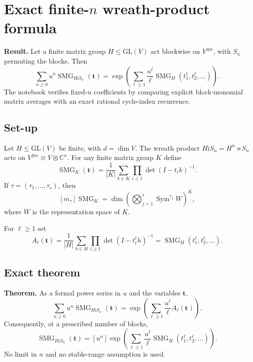 \documentclass[10pt]{article}
\newcommand{\Sym}{\operatorname{Sym}}
\newcommand{\SMG}{\operatorname{SMG}}
\newcommand{\C}{\mathbb C}
\begin{document}
\section[Exact finite-n wreath-product formula]{Exact finite-$n$ wreath-product formula}\label{proof:wreath-finite}
\begingroup
{}
\providecommand{\Ms}{\SMG}
\renewcommand{\Ms}{\SMG}
\providecommand{\Sym}{\operatorname{Sym}}
\renewcommand{\Sym}{\operatorname{Sym}}
\providecommand{\coeff}[1]{\left[#1\right]}
\renewcommand{\coeff}[1]{\left[#1\right]}
\providecommand{\C}{\mathbb C}
\renewcommand{\C}{\mathbb C}
\setcounter{theorem}{0}
\setcounter{proposition}{0}
\setcounter{lemma}{0}
\setcounter{corollary}{0}
\setcounter{remark}{0}
\colorbox{Pale}{\parbox{0.94\linewidth}{
\textbf{Result.} Let a finite matrix group $H\leq\mathrm{GL}(V)$ act blockwise
on $V^{\oplus n}$, with $S_n$ permuting the blocks.  Then
\[
\boxed{\displaystyle
\sum_{n\geq0}u^n\Ms_{H\wr S_n}(\mathbf t)
=\exp\!\left(\sum_{\ell\geq1}\frac{u^\ell}{\ell}
\Ms_H(t_1^\ell,t_2^\ell,\ldots)\right).}
\]
The notebook verifies fixed-$n$ coefficients by comparing explicit
block-monomial matrix averages with an exact rational cycle-index recurrence.
}}

\subsection{Set-up}

Let $H\leq\mathrm{GL}(V)$ be finite, with $d=\dim V$.  The wreath product
$H\wr S_n=H^n\rtimes S_n$ acts on
$V^{\oplus n}\cong V\otimes\C^n$.  For any finite matrix group $K$ define
\[
\Ms_K(\mathbf t)=\frac1{|K|}\sum_{k\in K}
\prod_{i\geq1}\det(I-t_i k)^{-1}.
\tag{1}
\]
If $\tau=(\tau_1,\ldots,\tau_s)$, then
\[
\coeff{m_\tau}\Ms_K
=\dim\!\left(\bigotimes_{j=1}^s\Sym^{\tau_j}W\right)^K,
\tag{2}
\]
where $W$ is the representation space of $K$.

For $\ell\geq1$ set
\[
A_\ell(\mathbf t)=\frac1{|H|}\sum_{h\in H}
\prod_{i\geq1}\det(I-t_i^\ell h)^{-1}
=\Ms_H(t_1^\ell,t_2^\ell,\ldots).
\tag{3}
\]

\subsection{Exact theorem}

\textbf{Theorem.}
As a formal power series in $u$ and the variables $\mathbf t$,
\[
\sum_{n\geq0}u^n\Ms_{H\wr S_n}(\mathbf t)
=\exp\!\left(\sum_{\ell\geq1}\frac{u^\ell}{\ell}A_\ell(\mathbf t)\right).
\tag{4}
\]
Consequently, at a prescribed number of blocks,
\[
\Ms_{H\wr S_n}(\mathbf t)=\coeff{u^n}
\exp\!\left(\sum_{\ell\geq1}\frac{u^\ell}{\ell}
\Ms_H(t_1^\ell,t_2^\ell,\ldots)\right).
\tag{5}
\]
No limit in $n$ and no stable-range assumption is used.
\end{document}
